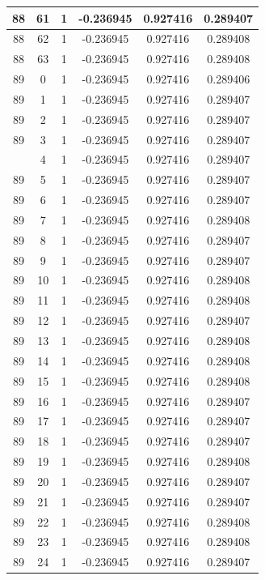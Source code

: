 \documentclass[12pt,a4paper]{article}
\numberwithin{equation}{section}
\numberwithin{figure}{section}
\numberwithin{table}{section}
\begin{document}
\begin{longtable}{|c|c|c|c|c|c|}
88 & 61 & 1 & -0.236945 & 0.927416 & 0.289407 \\ \hline
88 & 62 & 1 & -0.236945 & 0.927416 & 0.289408 \\ \hline
88 & 63 & 1 & -0.236945 & 0.927416 & 0.289408 \\ \hline
89 & 0 & 1 & -0.236945 & 0.927416 & 0.289406 \\ \hline
89 & 1 & 1 & -0.236945 & 0.927416 & 0.289407 \\ \hline
89 & 2 & 1 & -0.236945 & 0.927416 & 0.289407 \\ \hline
89 & 3 & 1 & -0.236945 & 0.927416 & 0.289407 \\ \hline
\pagebreak
89 & 4 & 1 & -0.236945 & 0.927416 & 0.289407 \\ \hline
89 & 5 & 1 & -0.236945 & 0.927416 & 0.289407 \\ \hline
89 & 6 & 1 & -0.236945 & 0.927416 & 0.289407 \\ \hline
89 & 7 & 1 & -0.236945 & 0.927416 & 0.289408 \\ \hline
89 & 8 & 1 & -0.236945 & 0.927416 & 0.289407 \\ \hline
89 & 9 & 1 & -0.236945 & 0.927416 & 0.289407 \\ \hline
89 & 10 & 1 & -0.236945 & 0.927416 & 0.289408 \\ \hline
89 & 11 & 1 & -0.236945 & 0.927416 & 0.289408 \\ \hline
89 & 12 & 1 & -0.236945 & 0.927416 & 0.289407 \\ \hline
89 & 13 & 1 & -0.236945 & 0.927416 & 0.289408 \\ \hline
89 & 14 & 1 & -0.236945 & 0.927416 & 0.289408 \\ \hline
89 & 15 & 1 & -0.236945 & 0.927416 & 0.289408 \\ \hline
89 & 16 & 1 & -0.236945 & 0.927416 & 0.289407 \\ \hline
89 & 17 & 1 & -0.236945 & 0.927416 & 0.289407 \\ \hline
89 & 18 & 1 & -0.236945 & 0.927416 & 0.289407 \\ \hline
89 & 19 & 1 & -0.236945 & 0.927416 & 0.289408 \\ \hline
89 & 20 & 1 & -0.236945 & 0.927416 & 0.289407 \\ \hline
89 & 21 & 1 & -0.236945 & 0.927416 & 0.289407 \\ \hline
89 & 22 & 1 & -0.236945 & 0.927416 & 0.289408 \\ \hline
89 & 23 & 1 & -0.236945 & 0.927416 & 0.289408 \\ \hline
89 & 24 & 1 & -0.236945 & 0.927416 & 0.289407 \\ \hline

\end{longtable}
\end{document}
